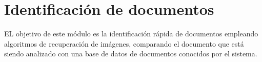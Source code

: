 






\section{Identificación de documentos}
EL objetivo de este módulo es la identificación rápida de documentos empleando algoritmos de
recuperación de imágenes, comparando el documento que está siendo analizado con una base de datos de
documentos conocidos por el sistema.


